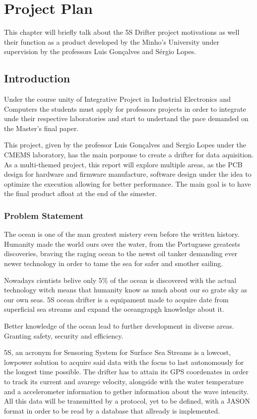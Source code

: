 \chapter{Project Plan}
    This chapter will briefly talk about the 5S Drifter project motivations as well their function as a product developed 
    by the Minho's University under supervision by the professors Luis Gonçalves and Sérgio Lopes.
\section{Introduction}
Under the course unity of Integrative Project in Industrial Electronics and Computers the students must
apply for professors projects in order to integrate unde their respective laboratories and start to undertand the pace
demanded on the Master's final paper.

This project, given by the professor Luis Gonçalves and Sergio Lopes under the CMEMS laboratory,
has the main porpouse to create a drifter for data aquisition. As a multi-themed project, this report will
explore multiple areas, as the PCB design for hardware and firmware manufacture, software design under the idea to optimize
the execution allowing for better performance. The main goal is to have the final product afloat at the end of the simester.

\subsection{Problem Statement}
The ocean is one of the man greatest mistery even before the written history. Humanity made the world ours over the water, 
from the Portuguese greatests discoveries, braving the raging ocean to the newst oil tanker demanding ever newer technology
in order to tame the sea for safer and smother sailing.

Nowadays cientists belive only 5\% of the ocean is discovered with the actual technology witch means that humanity 
know as much about our so grate sky as our own seas. 5S ocean drifter is a equipament made to acquire date from 
superficial sea streams and expand the oceangrapgh knowledge about it.

Better knowledge of the ocean lead to further development in diverse areas. Granting safety,
security and efficiency.

5S, an acronym for Sensoring System for Surface Sea Streams is a lowcost, lowpower solution to acquire
said data with the focus to last autonomously for the longest time possible. The drifter has to attain its GPS
coordenates in order to track its current and avarege velocity, alongside with the water temperature and a accelerometer 
information to gether information about the wave intencity. All this data will be transmitted by a protocol,
 yet to be defined, with a JASON format in order to be read by a database that allready is implemented.  


